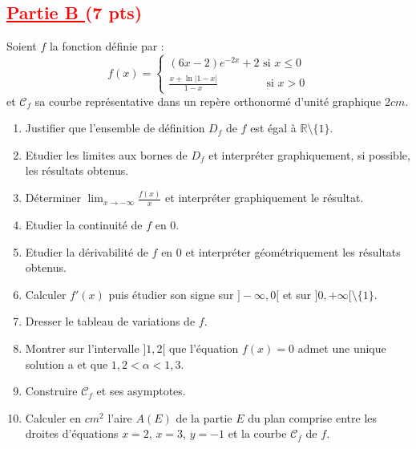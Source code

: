 \documentclass[12pt]{article}
\begin{document}
\subsection*{\textcolor{red}{\underline{Partie B }(7 pts)}}
Soient $f$ la fonction définie par :
\[
f(x)=
\begin{cases}
(6x-2)e^{-2x}+2 \text{ si } x\leq 0 \\
\frac{x+\ln|1-x|}{1-x} \quad\quad\quad\quad\text{ si } x > 0
\end{cases}
\]
et $\mathscr{C}_{f}$ sa courbe représentative dans un repère orthonormé d'unité graphique $2cm$.
\begin{enumerate}
    \item Justifier que l'ensemble de définition $D_{f}$ de $f$ est égal à $\mathbb{R}\setminus\{1\}$.
    \item Etudier les limites aux bornes de $D_{f}$ et interpréter graphiquement, si possible, les résultats obtenus.
    \item Déterminer $\lim_{x\to -\infty}\frac{f(x)}{x}$ et interpréter graphiquement le résultat.
    \item Etudier la continuité de $f$ en 0.
    \item Etudier la dérivabilité de $f$ en 0 et interpréter géométriquement les résultats obtenus.
    \item Calculer $f'(x)$ puis étudier son signe sur $]-\infty, 0[$ et sur $]0, +\infty[\setminus\{1\}$.
    \item Dresser le tableau de variations de $f$.
    \item Montrer sur l'intervalle $]1, 2[$ que l'équation $f(x) = 0$ admet une unique solution a et que $1,2 < \alpha < 1,3$.
    \item Construire $\mathscr{C}_{f}$ et ses asymptotes.
    \item Calculer en $cm^{2}$ l'aire $A(E)$ de la partie $E$ du plan comprise entre les droites d'équations $x = 2$, $x = 3$, $y = -1$ et la courbe $\mathscr{C}_{f}$ de $f$.
\end{enumerate}
\end{document}
